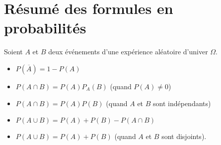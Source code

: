 \documentclass{article}
\begin{document}
\section{Résumé des formules en probabilités}
Soient $A$ et $B$ deux événements d'une expérience aléatoire d'univer $\Omega$.
\begin{itemize}
\item $P(\overbar{A}) = 1 - P(A)$
\item $P(A \cap B) = P(A)P_A(B)$ (quand $P(A) \neq 0$)
\item $P(A \cap B) = P(A)P(B)$ (quand $A$ et $B$ sont indépendants)
\item $P(A \cup B) = P(A) + P(B) - P(A \cap B)$
\item $P(A \cup B) = P(A) + P(B)$ (quand $A$ et $B$ sont disjoints).
\end{itemize}
\end{document}

